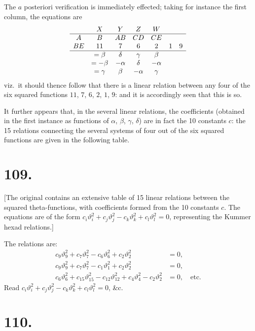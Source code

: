 \documentclass[11pt,a4paper]{article}
\newcommand{\uth}[1]{\vartheta_{#1}}
\begin{document}
The $a$ posteriori verification is immediately effected; taking for instance the first column, the equations are
\[
\begin{array}{ccccccc}
& X & Y & Z & W & & \\
\hline
A & B & AB & CD & CE & & \\
BE & 11 & 7 & 6 & 2 & 1 & 9 \\
\hline
& = \beta & \delta & \gamma & \beta & & \\
& = -\beta & -\alpha & \delta & -\alpha & & \\
& = \gamma & \beta & -\alpha & \gamma & &
\end{array}
\]
viz.\ it should thence follow that there is a linear relation between any four of the six squared functions $11$, $7$, $6$, $2$, $1$, $9$: and it is accordingly seen that this is so.

It further appears that, in the several linear relations, the coefficients (obtained in the first instance as functions of $\alpha$, $\beta$, $\gamma$, $\delta$) are in fact the 10 constants $c$: the 15 relations connecting the several systems of four out of the six squared functions are given in the following table.

\newpage
\section*{109.}
\label{sec:109}

[The original contains an extensive table of 15 linear relations between the squared theta-functions, with coefficients formed from the 10 constants $c$. The equations are of the form $c_i\uth{i}^2 + c_j\uth{j}^2 - c_k\uth{k}^2 + c_l\uth{l}^2 = 0$, representing the Kummer hexad relations.]

The relations are:
\begin{align*}
c_9\uth{9}^2 + c_7\uth{7}^2 - c_6\uth{6}^2 + c_2\uth{2}^2 &= 0, \\
c_9\uth{9}^2 + c_7\uth{7}^2 - c_1\uth{1}^2 + c_2\uth{2}^2 &= 0, \\
c_6\uth{6}^2 + c_{15}\uth{15}^2 - c_{12}\uth{12}^2 + c_4\uth{4}^2 - c_2\uth{2}^2 &= 0, \quad \text{etc.}
\end{align*}
Read $c_i\uth{i}^2 + c_j\uth{j}^2 - c_k\uth{k}^2 + c_l\uth{l}^2 = 0$, \&c.

\newpage
\section*{110.}
\label{sec:110}
\end{document}
